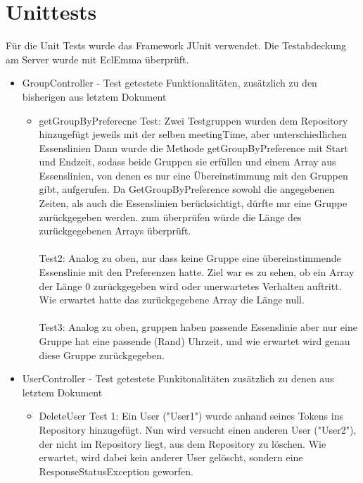 \documentclass[a4paper]{scrreprt}
\begin{document}
\section{Unittests}
Für die Unit Tests wurde das Framework JUnit verwendet. Die Testabdeckung am Server wurde mit EclEmma überprüft.

\begin{itemize}

\item GroupController - Test
getestete Funktionalitäten, zusätzlich zu den bisherigen aus letztem Dokument
\begin{itemize}


\item getGroupByPreferecne
Test: Zwei Testgruppen wurden dem Repository hinzugefügt jeweils mit der selben meetingTime, aber unterschiedlichen Essenslinien
Dann wurde die Methode getGroupByPreference mit Start und Endzeit, sodass beide Gruppen sie erfüllen und einem Array aus Essenslinien, von denen es nur eine Übereinstimmung mit den Gruppen gibt, aufgerufen.
Da GetGroupByPreference sowohl die angegebenen Zeiten, als auch die Essenslinien berücksichtigt, dürfte nur eine Gruppe zurückgegeben werden.
zum überprüfen würde die Länge des zurückgegebenen Arrays überprüft.
\\ \\
Test2: Analog zu oben, nur dass keine Gruppe eine übereinstimmende Essenslinie mit den Preferenzen hatte.
Ziel war es zu sehen, ob ein Array der Länge 0 zurückgegeben wird oder unerwartetes Verhalten auftritt.
Wie erwartet hatte das zurückgegebene Array die Länge null.
\\ \\
Test3: Analog zu oben, gruppen haben passende Essenslinie aber nur eine Gruppe hat eine passende (Rand) Uhrzeit, und wie erwartet wird genau diese Gruppe zurückgegeben.
\end{itemize}

\item UserController - Test 
getestete Funkitonalitäten zusätzlich zu denen aus letztem Dokument

\begin{itemize}

\item DeleteUser
Test 1: Ein User ("User1") wurde anhand seines Tokens ins Repository hinzugefügt. Nun wird versucht einen anderen User ("User2"), der nicht im Repository liegt, aus dem Repository zu löschen. Wie erwartet, wird dabei kein anderer User gelöscht, sondern eine ResponseStatusException geworfen.


\end{itemize}
\end{itemize}
\end{document}
